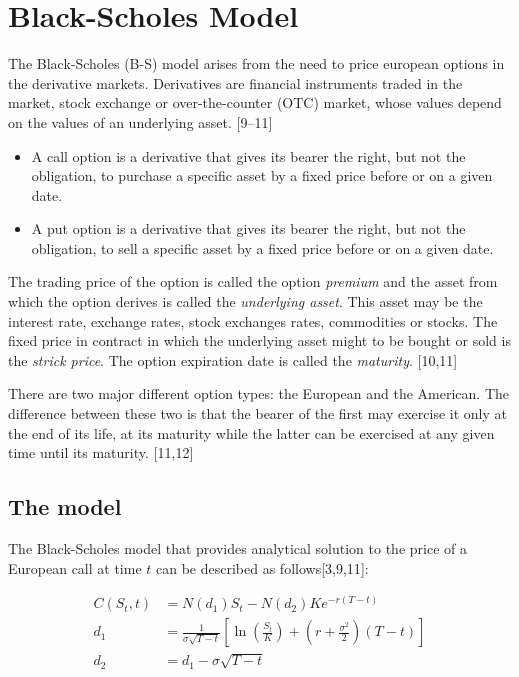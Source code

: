 \documentclass[12pt,twoside]{reedthesis}
\theoremstyle{definition}
\theoremstyle{definition}
\theoremstyle{remark}
\begin{document}
  \section{Black-Scholes Model}\label{black-scholes-model}
  
  The Black-Scholes (B-S) model arises from the need to price european
  options in the derivative markets. Derivatives are financial instruments
  traded in the market, stock exchange or over-the-counter (OTC) market,
  whose values depend on the values of an underlying asset. {[}9--11{]}
  
  \begin{itemize}
  \item
    A call option is a derivative that gives its bearer the right, but not
    the obligation, to purchase a specific asset by a fixed price before
    or on a given date.
  \item
    A put option is a derivative that gives its bearer the right, but not
    the obligation, to sell a specific asset by a fixed price before or on
    a given date.
  \end{itemize}
  
  The trading price of the option is called the option \emph{premium} and
  the asset from which the option derives is called the \emph{underlying
  asset}. This asset may be the interest rate, exchange rates, stock
  exchanges rates, commodities or stocks. The fixed price in contract in
  which the underlying asset might to be bought or sold is the
  \emph{strick price}. The option expiration date is called the
  \emph{maturity}. {[}10,11{]}
  
  There are two major different option types: the European and the
  American. The difference between these two is that the bearer of the
  first may exercise it only at the end of its life, at its maturity while
  the latter can be exercised at any given time until its maturity.
  {[}11,12{]}
  
  \subsection{The model}\label{the-model}
  
  The Black-Scholes model that provides analytical solution to the price
  of a European call at time \(t\) can be described as
  follows{[}3,9,11{]}:
  
  \begin{align}
  C(S_{t},t)&=N(d_{1})S_{t}-N(d_{2})Ke^{-r(T-t)}\\[10pt]
  d_{1}&={\frac {1}{\sigma {\sqrt {T-t}}}}\left[\ln \left({\frac {S_{t}}{K}}\right)+\left(r+{\frac {\sigma ^{2}}{2}}\right)(T-t)\right]\\[10pt]
  d_{2}&=d_{1}-\sigma {\sqrt {T-t}}
  \end{align}
  
\end{document}
